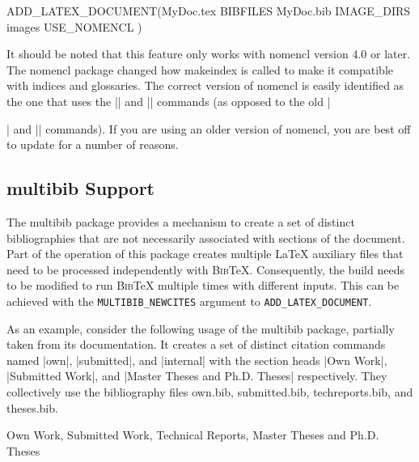 \documentclass{article}
\newcommand*{\textfile}[1]{\textsf{#1}}
\newcommand*{\textprog}[1]{\textfile{#1}}
\newcommand*{\textlatexpackage}[1]{\textsf{#1}}
\newcommand*{\textcmake}[1]{\texttt{#1}}
\newcommand*{\latex}{\LaTeX\xspace}
\newcommand*{\bibtex}{\textsc{Bib}\TeX\xspace}
\newcommand*{\ald}{\textcmake{ADD\_LATEX\_DOCUMENT}\xspace}
\begin{document}
  \begin{CodeListing}
ADD_LATEX_DOCUMENT(MyDoc.tex
  BIBFILES MyDoc.bib
  IMAGE_DIRS images
  USE_NOMENCL
  )
  \end{CodeListing}

  It should be noted that this feature only works with
  \textlatexpackage{nomencl} version 4.0 or later.  The
  \textlatexpackage{nomencl} package changed how \textprog{makeindex} is
  called to make it compatible with indices and glossaries.  The correct
  version of \textlatexpackage{nomencl} is easily identified as the one
  that uses the \textlatex|\makenomenclature| and
  \textlatex|\printnomenclature| commands (as opposed to the old
  \textlatex|\makeglossary| and \textlatex|\printglossary| commands).  If
  you are using an older version of \textlatexpackage{nomencl}, you are
  best off to update for a number of reasons.

  \subsection{\textlatexpackage{multibib} Support}
  \label{sec:multibibSupport}

  The \textlatexpackage{multibib} package provides a mechanism to create a
  set of distinct bibliographies that are not necessarily associated with
  sections of the document.  Part of the operation of this package creates
  multiple \latex auxiliary files that need to be processed independently
  with \bibtex.  Consequently, the build needs to be modified to run
  \bibtex multiple times with different inputs.  This can be achieved with
  the \textcmake{MULTIBIB\_NEWCITES} argument to \ald.

  As an example, consider the following usage of the
  \textlatexpackage{multibib} package, partially taken from its
  documentation.  It creates a set of distinct citation commands named
  \textlatex|own|, \textlatex|submitted|, and \textlatex|internal| with the
  section heads \textlatex|Own Work|, \textlatex|Submitted Work|, and
  \textlatex|Master Theses and Ph.D. Theses| respectively.  They
  collectively use the bibliography files \textfile{own.bib},
  \textfile{submitted.bib}, \textfile{techreports.bib}, and
  \textfile{theses.bib}.

  \begin{CodeListing}
%
  {Own Work,%
   Submitted Work,%
   {Technical Reports, Master Theses and Ph.D. Theses}}
  \end{CodeListing}
  \begin{CodeListing}
  \end{CodeListing}
  \begin{CodeListing}
  \end{CodeListing}
  \begin{CodeListing}
  \end{CodeListing}
\end{document}
